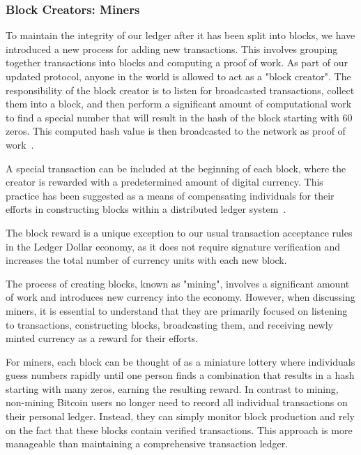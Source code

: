 \subsubsection{Block Creators: Miners}
To maintain the integrity of our ledger after it has been split into blocks, we have introduced a new process for adding
new transactions. This involves grouping together transactions into blocks and computing a proof of work. As part of our
updated protocol, anyone in the world is allowed to act as a "block creator". The responsibility of the block creator is
to listen for broadcasted transactions, collect them into a block, and then perform a significant amount of
computational work to find a special number that will result in the hash of the block starting with 60 zeros. This
computed hash value is then broadcasted to the network as proof of work~\cite{wood2014ethereum}.

A special transaction can be included at the beginning of each block, where the creator is rewarded with a predetermined
amount of digital currency. This practice has been suggested as a means of compensating individuals for their efforts in
constructing blocks within a distributed ledger system~\cite{ding2020incentive}.

%

The block reward is a unique exception to our usual transaction acceptance rules in the Ledger Dollar economy, as it
does not require signature verification and increases the total number of currency units with each new block.

The process of creating blocks, known as "mining", involves a significant amount of work and introduces new currency
into the economy. However, when discussing miners, it is essential to understand that they are primarily focused on
listening to transactions, constructing blocks, broadcasting them, and receiving newly minted currency as a reward for
their efforts.

For miners, each block can be thought of as a miniature lottery where individuals guess numbers rapidly until one person
finds a combination that results in a hash starting with many zeros, earning the resulting reward. In contrast to
mining, non-mining Bitcoin users no longer need to record all individual transactions on their personal ledger. Instead,
they can simply monitor block production and rely on the fact that these blocks contain verified transactions. This
approach is more manageable than maintaining a comprehensive transaction ledger.


